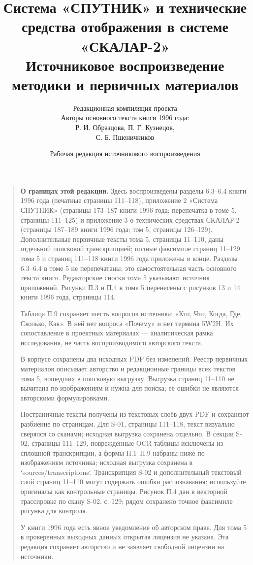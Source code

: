 \documentclass[12pt,a4paper]{article}
\title{Система «СПУТНИК» и технические средства отображения в системе «СКАЛАР-2»\\[0.5em]
\large Источниковое воспроизведение методики и первичных материалов}
\author{Редакционная компиляция проекта\\
\small Авторы основного текста книги 1996 года:\\
Р. И. Образцова, П. Г. Кузнецов,\\
С. Б. Пшеничников}
\date{Рабочая редакция источникового воспроизведения}
\begin{document}
\maketitle
\clearpage

\begin{quote}\small
\textbf{О границах этой редакции.} Здесь воспроизведены разделы 6.3--6.4 книги 1996 года (печатные страницы 111--118), приложение 2 «Система СПУТНИК» (страницы 173--187 книги 1996 года; перепечатка в томе 5, страницы 111--125) и приложение 3 о технических средствах СКАЛАР-2 (страницы 187--189 книги 1996 года; том 5, страницы 126--129). Дополнительные первичные тексты тома 5, страницы 11--110, даны отдельной поисковой транскрипцией; полные факсимиле страниц 11--129 тома 5 и страниц 111--118 книги 1996 года приложены в конце. Разделы 6.3--6.4 в томе 5 не перепечатаны; это самостоятельная часть основного текста книги. Редакторские сноски тома 5 указывают источник приложений. Рисунки П.3 и П.4 в томе 5 перенесены с рисунков 13 и 14 книги 1996 года, страницы 114.

Таблица П.9 сохраняет шесть вопросов источника: «Кто, Что, Когда, Где, Сколько, Как». В ней нет вопроса «Почему» и нет термина 5W2H. Их сопоставление в проектных материалах — аналитическая рамка исследования, не часть воспроизводимого авторского текста.

В корпусе сохранены два исходных PDF без изменений. Реестр первичных материалов описывает авторство и редакционные границы всех текстов тома 5, вошедших в поисковую выгрузку. Выгрузка страниц 11--110 не вычитана по изображениям и нужна для поиска; её ошибки не являются авторскими формулировками.

Постраничные тексты получены из текстовых слоёв двух PDF и сохраняют разбиение по страницам. Для S-01, страницы 111--118, текст визуально сверялся со сканами; исходная выгрузка сохранена отдельно. В секции S-02, страницы 111--129, повреждённые OCR-таблицы исключены из сплошной транскрипции, а формы П.1--П.9 набраны ниже по изображениям источника; исходная выгрузка сохранена в `sources/transcriptions`. Транскрипция S-02 и дополнительный текстовый слой страниц 11--110 могут содержать ошибки распознавания; используйте оригиналы как контрольные страницы. Рисунок П.4 дан в векторной трассировке по скану S-02, с. 129; рядом сохранено точное факсимиле рисунка для контроля.

У книги 1996 года есть явное уведомление об авторском праве. Для тома 5 в проверенных выходных данных открытая лицензия не указана. Эта редакция сохраняет авторство и не заявляет свободной лицензии на источники.
\end{quote}
\end{document}
